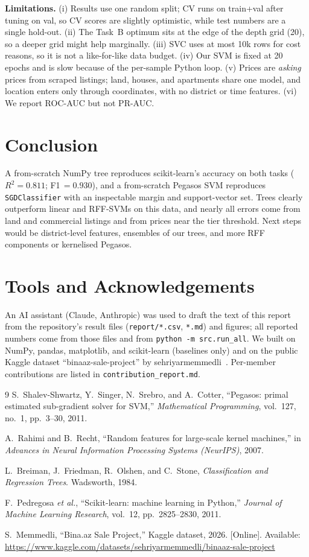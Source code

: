 \documentclass[10pt,twocolumn,a4paper]{article}
\begin{document}
\textbf{Limitations.} (i) Results use one random split; CV runs on
train+val after tuning on val, so CV scores are slightly optimistic, while test numbers
are a single hold-out. (ii) The Task~B optimum sits at the edge of the depth grid
(20), so a deeper grid might help marginally. (iii) SVC uses at most 10k rows for
cost reasons, so it is not a like-for-like data budget. (iv) Our SVM is fixed at
20 epochs and is slow because of the per-sample Python loop. (v) Prices are
\emph{asking} prices from scraped listings; land, houses, and apartments share one
model, and location enters only through coordinates, with no district or time
features. (vi) We report ROC-AUC but not PR-AUC.

\section{Conclusion}
A from-scratch NumPy tree reproduces scikit-learn's accuracy on both tasks
($R^2=0.811$; F1\,$=0.930$), and a from-scratch Pegasos SVM reproduces
\texttt{SGDClassifier} with an inspectable margin and support-vector set. Trees
clearly outperform linear and RFF-SVMs on this data, and nearly all
errors come from land and commercial listings and from prices near the tier
threshold. Next steps would be district-level features, ensembles of our trees, and more
RFF components or kernelised Pegasos.

\section*{Tools and Acknowledgements}
An AI assistant (Claude, Anthropic) was used to draft the text of this report from
the repository's result files (\texttt{report/*.csv}, \texttt{*.md}) and figures;
all reported numbers come from those files and from \texttt{python -m src.run\_all}.
We built on NumPy, pandas, matplotlib, and scikit-learn (baselines only) and on the public
Kaggle dataset ``binaaz-sale-project'' by sehriyarmemmedli~\cite{data}.
Per-member contributions are listed in \texttt{contribution\_report.md}.

\begin{thebibliography}{9}
S.~Shalev-Shwartz, Y.~Singer, N.~Srebro, and A.~Cotter,
``Pegasos: primal estimated sub-gradient solver for SVM,''
\emph{Mathematical Programming}, vol.~127, no.~1, pp.~3--30, 2011.

A.~Rahimi and B.~Recht, ``Random features for large-scale kernel machines,''
in \emph{Advances in Neural Information Processing Systems (NeurIPS)}, 2007.

L.~Breiman, J.~Friedman, R.~Olshen, and C.~Stone,
\emph{Classification and Regression Trees}. Wadsworth, 1984.

F.~Pedregosa \emph{et al.}, ``Scikit-learn: machine learning in Python,''
\emph{Journal of Machine Learning Research}, vol.~12, pp.~2825--2830, 2011.

S.~Memmedli, ``Bina.az Sale Project,'' Kaggle dataset, 2026.
[Online]. Available: \url{https://www.kaggle.com/datasets/sehriyarmemmedli/binaaz-sale-project}
\end{thebibliography}
\end{document}
